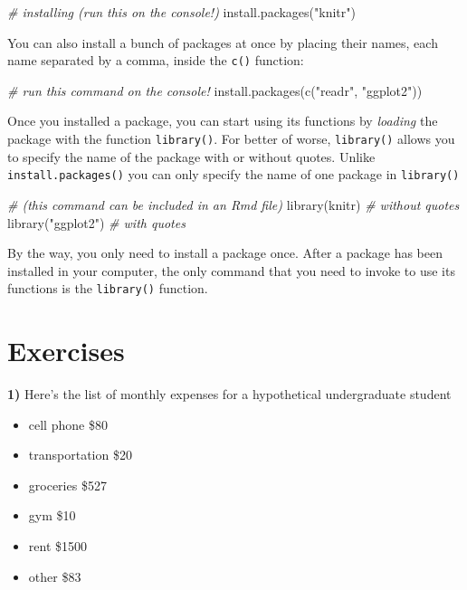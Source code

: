 \documentclass[
]{book}
\newenvironment{Shaded}{\begin{snugshade}}{\end{snugshade}}
\newcommand{\CommentTok}[1]{\textcolor[rgb]{0.56,0.35,0.01}{\textit{#1}}}
\newcommand{\FunctionTok}[1]{\textcolor[rgb]{0.00,0.00,0.00}{#1}}
\newcommand{\NormalTok}[1]{#1}
\newcommand{\StringTok}[1]{\textcolor[rgb]{0.31,0.60,0.02}{#1}}
\providecommand{\tightlist}{%
  \setlength{\itemsep}{0pt}\setlength{\parskip}{0pt}}
\begin{document}
\begin{Shaded}
\begin{Highlighting}[]
\CommentTok{\# installing (run this on the console!)}
\FunctionTok{install.packages}\NormalTok{(}\StringTok{"knitr"}\NormalTok{)}
\end{Highlighting}
\end{Shaded}

You can also install a bunch of packages at once by placing their names,
each name separated by a comma, inside the \texttt{c()} function:

\begin{Shaded}
\begin{Highlighting}[]
\CommentTok{\# run this command on the console!}
\FunctionTok{install.packages}\NormalTok{(}\FunctionTok{c}\NormalTok{(}\StringTok{"readr"}\NormalTok{, }\StringTok{"ggplot2"}\NormalTok{))}
\end{Highlighting}
\end{Shaded}

Once you installed a package, you can start using its functions by \emph{loading}
the package with the function \texttt{library()}. For better of worse, \texttt{library()}
allows you to specify the name of the package with or without quotes. Unlike
\texttt{install.packages()} you can only specify the name of one package in \texttt{library()}

\begin{Shaded}
\begin{Highlighting}[]
\CommentTok{\# (this command can be included in an Rmd file)}
\FunctionTok{library}\NormalTok{(knitr)      }\CommentTok{\# without quotes}
\FunctionTok{library}\NormalTok{(}\StringTok{"ggplot2"}\NormalTok{)  }\CommentTok{\# with quotes}
\end{Highlighting}
\end{Shaded}

By the way, you only need to install a package once. After a package has been
installed in your computer, the only command that you need to invoke to use
its functions is the \texttt{library()} function.

\hypertarget{exercises}{%
\section{Exercises}\label{exercises}}

\textbf{1)} Here's the list of monthly expenses for a hypothetical undergraduate
student

\begin{itemize}
\tightlist
\item
  cell phone \$80
\item
  transportation \$20
\item
  groceries \$527
\item
  gym \$10
\item
  rent \$1500
\item
  other \$83
\end{itemize}
\end{document}
